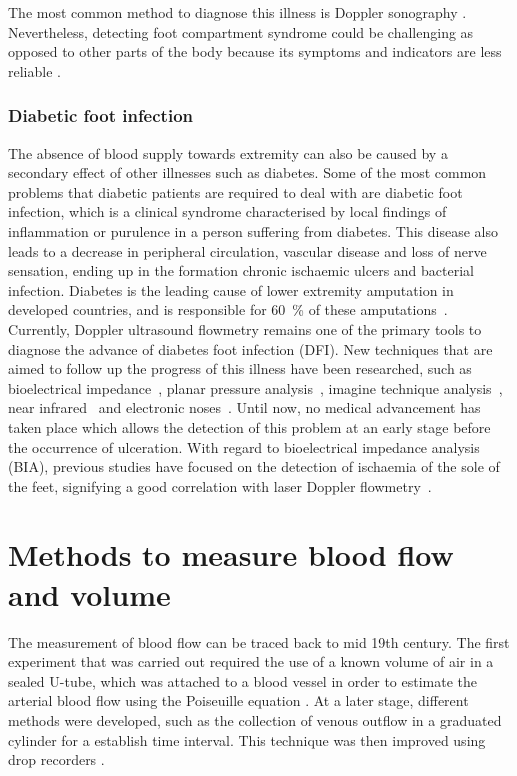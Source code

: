 The most common method to diagnose this illness is Doppler sonography \cite{chhabra2013compartment}. Nevertheless, detecting foot compartment syndrome could be challenging as opposed to other parts of the body because its symptoms and indicators are less reliable \cite{dodd2013foot}.

\subsubsection{Diabetic foot infection}
\label{section literature 2.3} 
The absence of blood supply towards extremity can also be caused by a secondary effect of other illnesses such as diabetes. Some of the most common problems that diabetic patients are required to deal with are diabetic foot infection, which is a clinical syndrome characterised by local findings of inflammation or purulence in a person suffering from diabetes. This disease also leads to a decrease in peripheral circulation, vascular disease and loss of nerve sensation, ending up in the formation chronic ischaemic ulcers and bacterial infection. Diabetes is the leading cause of lower extremity amputation in developed countries, and is responsible for \SI{60}{\percent} of these amputations~\cite{ucckay2014diabetic}.  Currently, Doppler ultrasound flowmetry remains one of the primary tools to diagnose the advance of diabetes foot infection (DFI). New techniques that are aimed to follow up the progress of this illness have been researched, such as bioelectrical impedance~\cite{cheng2012application}, planar pressure analysis~\cite{dos2010insole}, imagine technique analysis~\cite{songer2001tissue}, near infrared~\cite{papazoglou2008assessment} and electronic noses~\cite{yusuf2013diagnosis}. Until now, no medical advancement has taken place which allows the detection of this problem at an early stage before the occurrence of ulceration. With regard to bioelectrical impedance analysis (BIA), previous studies have focused on the detection of ischaemia of the sole of the feet, signifying a good correlation with laser Doppler flowmetry~\cite{cheng2012application}. 

\section{Methods to measure blood flow and volume}
The measurement of blood flow can be traced back to mid 19th century. The first experiment that was carried out required the use of a known volume of air in a sealed U-tube, which was attached to a blood vessel in order to estimate the arterial blood flow using the Poiseuille equation \cite{dokunin1958modification}. At a later stage, different methods were developed, such as the collection of venous outflow in a graduated cylinder for a establish time interval. This technique was then improved using drop recorders \cite{jayanthy2011measuring}.

